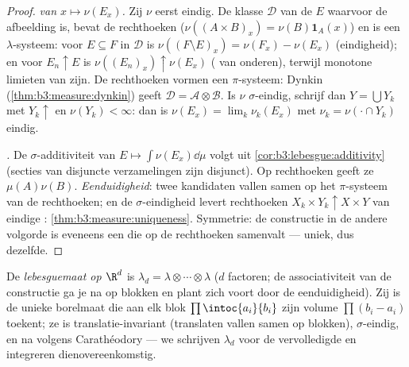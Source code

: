 \begin{proof}
\emph{ van $x \mapsto \nu(E_x)$.} Zij $\nu$ eerst
eindig. De klasse $\mathcal D$ van de $E$ waarvoor de afbeelding
 is, bevat de rechthoeken ($\nu((A\times B)_x) =
\nu(B)\mathbf 1_A(x)$) en is een $\lambda$-systeem: voor $E
\subseteq F$ in $\mathcal D$ is $\nu((F\setminus E)_x) = \nu(F_x)
- \nu(E_x)$ (eindigheid); en voor $E_n \uparrow E$ is
$\nu((E_n)_x) \uparrow \nu(E_x)$ ( van onderen),
terwijl monotone limieten van   zijn. De
rechthoeken vormen een $\pi$-systeem: Dynkin
(\cref{thm:b3:measure:dynkin}) geeft $\mathcal D = \mathcal
A\otimes\mathcal B$. Is $\nu$ $\sigma$-eindig, schrijf dan $Y =
\bigcup Y_k$ met $Y_k \uparrow$ en $\nu(Y_k) < \infty$: dan is
$\nu(E_x) = \lim_k\nu_k(E_x)$ met $\nu_k = \nu(\cdot\cap Y_k)$
eindig.

\emph{.} De $\sigma$-additiviteit van $E \mapsto
\int\nu(E_x)\dd\mu$ volgt uit
\cref{cor:b3:lebesgue:additivity} (secties van disjuncte
verzamelingen zijn disjunct). Op rechthoeken geeft ze
$\mu(A)\nu(B)$. \emph{Eenduidigheid}: twee kandidaten vallen samen
op het $\pi$-systeem van de rechthoeken; en de
$\sigma$-eindigheid levert rechthoeken $X_k\times Y_k \uparrow
X\times Y$ van eindige :
\cref{thm:b3:measure:uniqueness}. Symmetrie: de constructie in de
andere volgorde is eveneens een  die op de rechthoeken
samenvalt --- uniek, dus dezelfde.
\end{proof}

\begin{definition}\label{def:b3:product:lebesgue}
De \emph{lebesguemaat op $\R^d$} is
$\lambda_d = \lambda\otimes\cdots\otimes\lambda$ ($d$ factoren; de
associativiteit van de constructie ga je na op blokken en plant
zich voort door de eenduidigheid). Zij is de unieke borelmaat die
aan elk blok $\prod\intoc{a_i}{b_i}$ zijn volume $\prod(b_i -
a_i)$ toekent; ze is translatie-invariant (translaten vallen samen
op blokken), $\sigma$-eindig, en  na 
volgens Carathéodory --- we schrijven $\lambda_d$ voor de
vervolledigde  en integreren dienovereenkomstig.
\end{definition}

